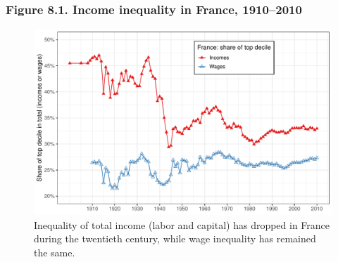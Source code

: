 \documentclass[t]{beamer}\usepackage[]{graphicx}\usepackage[]{color}
\newenvironment{knitrout}{}{} %
\begin{document}
\begin{frame}[label=Figure_8_1,fragile]
\frametitle{Figure 8.1. Income inequality in France, 1910--2010}
\begin{figure}[t]
\begin{minipage}[b]{\textwidth}
\centering
\begin{knitrout}\footnotesize
{}\color{fgcolor}

{\centering \includegraphics[width=1\linewidth]{figures/color/Figure_8_1} 

}



\end{knitrout}
\caption{Inequality of total income (labor and capital) has dropped in France during the twentieth century, while wage inequality has remained the same.}
\end{minipage}
\end{figure}
\end{frame}
\end{document}
